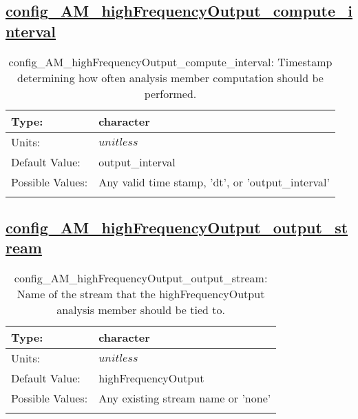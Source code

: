 \subsection[config\_AM\_highFrequencyOutput\_compute\_interval]{\hyperref[sec:nm_tab_AM_highFrequencyOutput]{config\_AM\_highFrequencyOutput\_compute\_interval}}
\label{subsec:nm_sec_config_AM_highFrequencyOutput_compute_interval}
\begin{center}
\begin{longtable}{| p{2.0in} || p{4.0in} |}
    \hline
    Type: & character \\
    \hline
    Units: & $unitless$ \\
    \hline
    Default Value: & output\_interval \\
    \hline
    Possible Values: & Any valid time stamp, 'dt', or 'output\_interval' \\
    \hline
    \caption{config\_AM\_highFrequencyOutput\_compute\_interval: Timestamp determining how often analysis member computation should be performed.}
\end{longtable}
\end{center}
\subsection[config\_AM\_highFrequencyOutput\_output\_stream]{\hyperref[sec:nm_tab_AM_highFrequencyOutput]{config\_AM\_highFrequencyOutput\_output\_stream}}
\label{subsec:nm_sec_config_AM_highFrequencyOutput_output_stream}
\begin{center}
\begin{longtable}{| p{2.0in} || p{4.0in} |}
    \hline
    Type: & character \\
    \hline
    Units: & $unitless$ \\
    \hline
    Default Value: & highFrequencyOutput \\
    \hline
    Possible Values: & Any existing stream name or 'none' \\
    \hline
    \caption{config\_AM\_highFrequencyOutput\_output\_stream: Name of the stream that the highFrequencyOutput analysis member should be tied to.}
\end{longtable}
\end{center}
